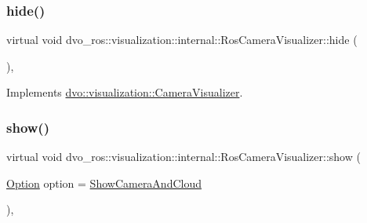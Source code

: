 \subsubsection{\texorpdfstring{hide()}{hide()}}
{\footnotesize\ttfamily virtual void dvo\+\_\+ros\+::visualization\+::internal\+::\+Ros\+Camera\+Visualizer\+::hide (\begin{DoxyParamCaption}{ }\end{DoxyParamCaption})\hspace{0.3cm}{\ttfamily [inline]}, {\ttfamily [virtual]}}



Implements \mbox{\hyperlink{classdvo_1_1visualization_1_1_camera_visualizer_a45dbf0d449a7b7529f7da477c676ca85}{dvo\+::visualization\+::\+Camera\+Visualizer}}.

\mbox{\label{classdvo__ros_1_1visualization_1_1internal_1_1_ros_camera_visualizer_afb9b360caa2de42ad4b9fd55c85b98df}} 
\subsubsection{\texorpdfstring{show()}{show()}}
{\footnotesize\ttfamily virtual void dvo\+\_\+ros\+::visualization\+::internal\+::\+Ros\+Camera\+Visualizer\+::show (\begin{DoxyParamCaption}\item[{\mbox{\hyperlink{classdvo_1_1visualization_1_1_camera_visualizer_a0526f50be9f298c4f7d1f91018d50af7}{Option}}}]{option = {\ttfamily \mbox{\hyperlink{classdvo_1_1visualization_1_1_camera_visualizer_a0526f50be9f298c4f7d1f91018d50af7a0ff8fc7d7283f27066e93ca0d4ef3f19}{Show\+Camera\+And\+Cloud}}} }\end{DoxyParamCaption})\hspace{0.3cm}{\ttfamily [inline]}, {\ttfamily [virtual]}}

\mbox{\label{classdvo__ros_1_1visualization_1_1internal_1_1_ros_camera_visualizer_aa347218752bde73e09874771fe3b4410}} 

